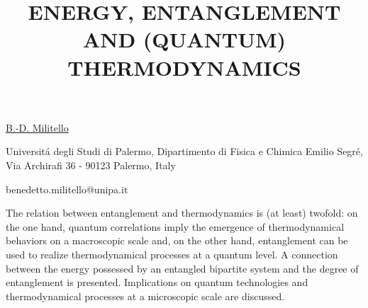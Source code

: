 \title{ENERGY, ENTANGLEMENT AND (QUANTUM) THERMODYNAMICS}

\underline{B.-D. Militello}  

{\normalsize{\vspace{-4mm}
Universit\'{a} degli Studi di Palermo,
Dipartimento di Fisica e Chimica Emilio Segr\'{e},
Via Archirafi 36 - 90123 Palermo, Italy



\email benedetto.militello@unipa.it}}

The relation between entanglement and thermodynamics is (at least) twofold: on the one hand, quantum correlations imply the emergence of thermodynamical behaviors on a macroscopic scale and, on the other hand, entanglement can be used to realize thermodynamical processes at a quantum level. A connection between the energy possessed by an entangled bipartite system and the degree of entanglement is presented. Implications on quantum technologies and thermodynamical processes at a microscopic scale are discussed.

\vspace{\baselineskip}